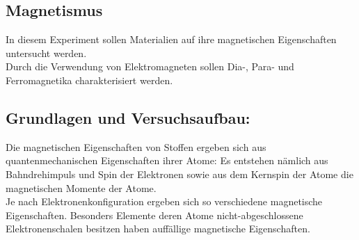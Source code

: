 \documentclass[12pt,a4paper]{article}
\begin{document}
\begin{multicols}{2}




%			




\section{Magnetismus}
In diesem Experiment sollen Materialien auf ihre magnetischen Eigenschaften untersucht werden.\\
Durch die Verwendung von Elektromagneten sollen Dia-, Para- und Ferromagnetika charakterisiert werden.

\subsection{Grundlagen und Versuchsaufbau:}
Die magnetischen Eigenschaften von Stoffen ergeben sich aus quantenmechanischen Eigenschaften ihrer Atome: Es entstehen nämlich aus Bahndrehimpuls und Spin der Elektronen sowie aus dem Kernspin der Atome die magnetischen Momente der Atome.\\
Je nach Elektronenkonfiguration ergeben sich so verschiedene magnetische Eigenschaften. Besonders Elemente deren Atome nicht-abgeschlossene Elektronenschalen besitzen haben auffällige magnetische Eigenschaften.\\


\end{multicols}
\end{document}
